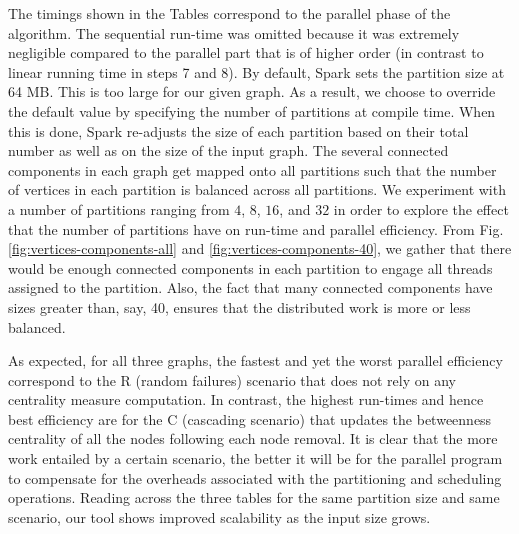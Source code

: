 %
%
The timings shown in the Tables correspond to the parallel phase of the algorithm. The sequential run-time was omitted because it was extremely negligible compared to the parallel part that is of higher order (in contrast to linear running time in steps 7 and 8).
%
By default, Spark sets the partition size at 64 MB. This is too large for our given graph. As a result, we choose to override the default value by specifying the number of partitions at compile time. When this is done, Spark re-adjusts the size of each partition based on their total number as well as on the size of the input graph. The several connected components in each graph get mapped onto all partitions such that the number of vertices in each partition is balanced across all partitions. We experiment with a number of partitions ranging from $4$, $8$, $16$, and $32$ in order to explore the effect that the number of partitions have on run-time and parallel efficiency. From Fig. \ref{fig:vertices-components-all} and \ref{fig:vertices-components-40}, we gather that there would be enough connected components in each partition to engage all threads assigned to the partition. Also, the fact that many connected components have sizes greater than, say, 40, ensures that the distributed work is more or less balanced.

As expected, for all three graphs, the fastest and yet the worst parallel efficiency correspond to the R (random failures) scenario that does not rely on any centrality measure computation. In contrast, the highest run-times and hence best efficiency are for the C (cascading scenario) that updates the betweenness centrality of all the nodes following each node removal. It is clear that the more work entailed by a certain scenario, the better it will be for the parallel program to compensate for the overheads associated with the partitioning and scheduling operations. Reading across the three tables for the same partition size and same scenario, our tool shows improved scalability as the input size grows. 

